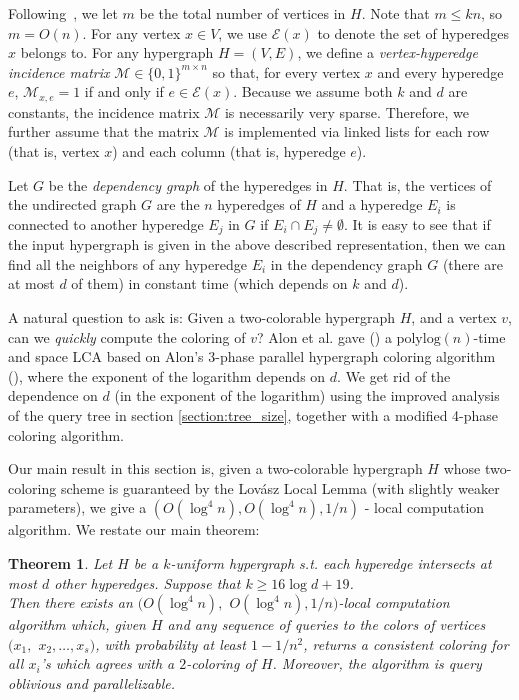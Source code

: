 \documentclass[english, oribibl]{llncs}
\newtheorem{theorem}{Theorem}[section]
\begin{document}
Following~\cite{RTVX11b}, we let $m$ be the total number of vertices in $H$. 
Note that $m\leq kn$, so $m=O(n)$.
For any vertex $x\in V$, we use $\mathcal{E}(x)$ to denote the set of hyperedges $x$ belongs to.
For any hypergraph $H = (V,E)$,
we define a \emph{vertex-hyperedge incidence matrix} $\mathcal{M}\in \{0,1\}^{m\times n}$
so that, for every vertex $x$ and every hyperedge $e$, 
$\mathcal{M}_{x,e}=1$ if and only if $e\in \mathcal{E}(x)$.
Because we assume both $k$ and $d$ are constants, 
the incidence matrix $\mathcal{M}$ is necessarily very sparse. 
Therefore, we further assume that the matrix $\mathcal{M}$ is implemented via
linked lists for each row (that is, vertex $x$) and each column (that is, hyperedge $e$). 

Let $G$ be the \emph{dependency graph} of the hyperedges in $H$. 
That is, the vertices of the undirected graph $G$
are the $n$ hyperedges of $H$ and a hyperedge $E_{i}$ is connected to
another hyperedge $E_{j}$ in $G$ if $E_{i}\cap E_{j} \neq \emptyset$.
It is easy to see that if the input hypergraph is given in the 
above described representation, then we can find all the neighbors of any hyperedge $E_{i}$ 
in the dependency graph $G$ (there are at most $d$ of them) in constant time (which depends on $k$ and $d$).

A natural question to ask is:
Given a two-colorable hypergraph $H$, and a vertex $v$,
can we \emph{quickly} compute the coloring of $v$?
Alon et al. gave (\cite{ARV+11}) a $\mathrm{polylog}(n)$-time and space LCA
based on Alon's 3-phase parallel hypergraph coloring algorithm (\cite{Alo91}),
where the exponent of the logarithm depends on $d$.
We get rid of the dependence on $d$ (in the exponent of the logarithm)
using the improved analysis of the query tree in section \ref{section:tree_size},
together with a modified 4-phase coloring algorithm.

Our main result in this section is,
given a two-colorable hypergraph $H$ whose two-coloring scheme is guaranteed by
the Lov{\'{a}}sz Local Lemma (with slightly weaker parameters),
we give a $(O(\log^4{n}), O(\log^4{n}), 1/n)$ - local computation algorithm.
We restate our main theorem:

\begin{theorem}
Let $H$ be a $k$-uniform hypergraph s.t. each hyperedge intersects at most $d$ other hyperedges.
Suppose that $k \geq 16 \log{d} + 19$. \\
Then there exists an $(O(\log^4{n}), $ $O(\log^4{n}), 1/n)$-local computation algorithm which, given $H$ and any sequence of
queries to the colors of vertices $(x_1, $ $x_2, \ldots, x_s)$, 
with probability at least $1-1/n^2$,
returns a consistent coloring for all $x_i$'s which 
agrees with a $2$-coloring of $H$. 
Moreover, the algorithm is query oblivious and parallelizable. 
\end{theorem}
\end{document}
